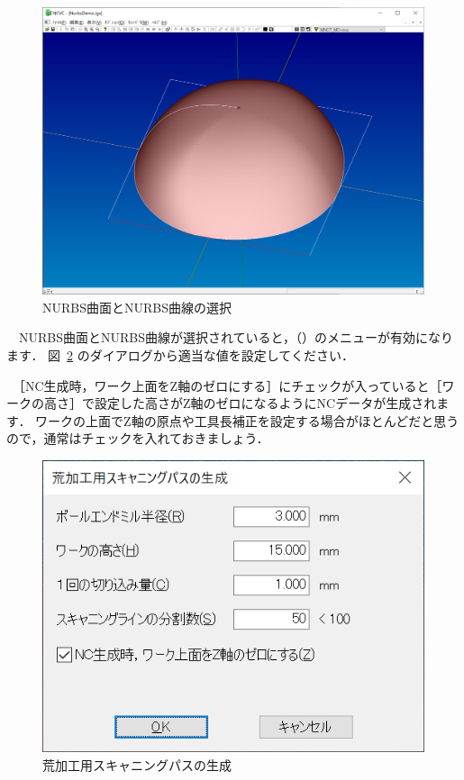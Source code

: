 \begin{figure}[H]
\centering
\includegraphics[scale=0.5]{No2/fig/fig22.png}
\caption{NURBS曲面とNURBS曲線の選択}
\label{fig:ncvc22}
\end{figure}

　NURBS曲面とNURBS曲線が選択されていると，（）のメニューが有効になります．
図~\ref{fig:ncvc23} のダイアログから適当な値を設定してください．

　［NC生成時，ワーク上面をZ軸のゼロにする］にチェックが入っていると［ワークの高さ］で設定した高さがZ軸のゼロになるようにNCデータが生成されます．
ワークの上面でZ軸の原点や工具長補正を設定する場合がほとんどだと思うので，通常はチェックを入れておきましょう．

\begin{figure}[H]
\centering
\includegraphics{No2/fig/fig23.png}
\caption{荒加工用スキャニングパスの生成}
\label{fig:ncvc23}
\end{figure}

